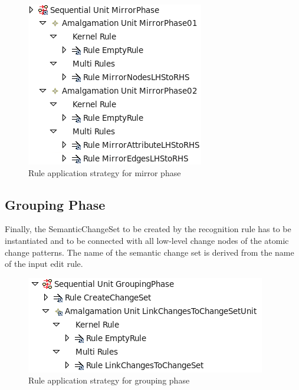\documentclass{llncs}
\begin{document}
\begin{figure}[htbp]
  \centering
  \includegraphics[scale=0.7]{pic/mirrorUnit_v02.png}
  \caption{Rule application strategy for mirror phase}
  \label{fig:mirrorUnit}
\end{figure}

\subsection{Grouping Phase}
Finally, the SemanticChangeSet to be created by the recognition
rule has to be instantiated and to be connected with all 
low-level change nodes of the atomic change patterns. The name
of the semantic change set is derived from the name of
the input edit rule.

\begin{figure}[htbp]
  \centering
  \includegraphics[scale=0.7]{pic/groupingUnit.png}
  \caption{Rule application strategy for grouping phase}
  \label{fig:groupingUnit}
\end{figure}
\end{document}
